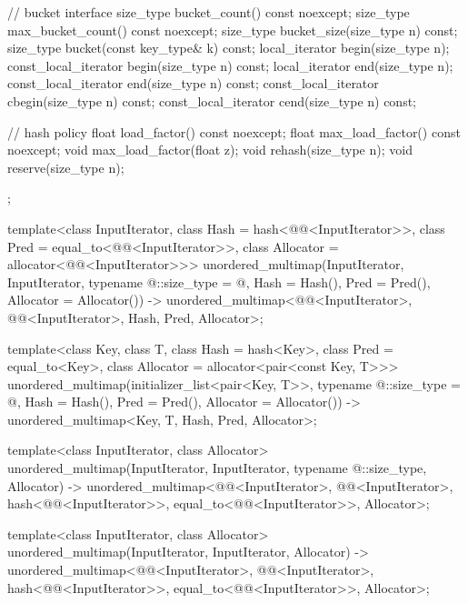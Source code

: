 \begin{codeblock}
{{    // bucket interface
    size_type bucket_count() const noexcept;
    size_type max_bucket_count() const noexcept;
    size_type bucket_size(size_type n) const;
    size_type bucket(const key_type& k) const;
    local_iterator begin(size_type n);
    const_local_iterator begin(size_type n) const;
    local_iterator end(size_type n);
    const_local_iterator end(size_type n) const;
    const_local_iterator cbegin(size_type n) const;
    const_local_iterator cend(size_type n) const;

    // hash policy
    float load_factor() const noexcept;
    float max_load_factor() const noexcept;
    void max_load_factor(float z);
    void rehash(size_type n);
    void reserve(size_type n);
  };

  template<class InputIterator,
           class Hash = hash<@@<InputIterator>>,
           class Pred = equal_to<@@<InputIterator>>,
           class Allocator = allocator<@@<InputIterator>>>
    unordered_multimap(InputIterator, InputIterator,
                       typename @\seebelow@::size_type = @\seebelow@,
                       Hash = Hash(), Pred = Pred(), Allocator = Allocator())
      -> unordered_multimap<@@<InputIterator>, @@<InputIterator>,
                            Hash, Pred, Allocator>;

  template<class Key, class T, class Hash = hash<Key>,
           class Pred = equal_to<Key>, class Allocator = allocator<pair<const Key, T>>>
    unordered_multimap(initializer_list<pair<Key, T>>,
                       typename @\seebelow@::size_type = @\seebelow@,
                       Hash = Hash(), Pred = Pred(), Allocator = Allocator())
      -> unordered_multimap<Key, T, Hash, Pred, Allocator>;

  template<class InputIterator, class Allocator>
    unordered_multimap(InputIterator, InputIterator, typename @\seebelow@::size_type, Allocator)
      -> unordered_multimap<@@<InputIterator>, @@<InputIterator>,
                            hash<@@<InputIterator>>,
                            equal_to<@@<InputIterator>>, Allocator>;

  template<class InputIterator, class Allocator>
    unordered_multimap(InputIterator, InputIterator, Allocator)
      -> unordered_multimap<@@<InputIterator>, @@<InputIterator>,
                            hash<@@<InputIterator>>,
                            equal_to<@@<InputIterator>>, Allocator>;

}
\end{codeblock}
